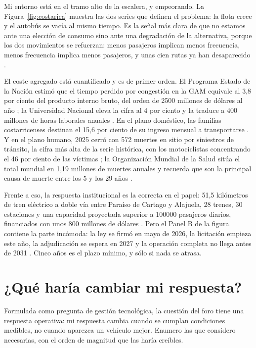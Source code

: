 \documentclass[11pt,letterpaper]{article}
\begin{document}
Mi entorno está en el tramo alto de la escalera, y empeorando. La
Figura~\ref{fig:costarica} muestra las dos series que definen el problema:
la flota crece y el autobús se vacía al mismo tiempo. Es la señal más clara de
que no estamos ante una elección de consumo sino ante una degradación de la
alternativa, porque los dos movimientos se refuerzan: menos pasajeros implican
menos frecuencia, menos frecuencia implica menos pasajeros, y unas cien rutas
ya han desaparecido \parencite{una2026}.

El coste agregado está cuantificado y es de primer orden. El Programa Estado de
la Nación estimó que el tiempo perdido por congestión en la GAM equivale al 3,8
por ciento del producto interno bruto, del orden de \num{2500} millones de
dólares al año \parencite{semanario2018,allen2026}; la Universidad Nacional
eleva la cifra al 4 por ciento y la traduce a 400 millones de horas laborales
anuales \parencite{una2026}. En el plano doméstico, las familias
costarricenses destinan el 15,6 por ciento de su ingreso mensual a
transportarse \parencite{allen2024}. Y en el plano humano, 2025 cerró con 572
muertes en sitio por siniestros de tránsito, la cifra más alta de la serie
histórica, con los motociclistas concentrando el 46 por ciento de las víctimas
\parencite{observador2026}; la Organización Mundial de la Salud sitúa el total
mundial en 1,19 millones de muertes anuales y recuerda que son la principal
causa de muerte entre los 5 y los 29 años \parencite{who2023}.

Frente a eso, la respuesta institucional es la correcta en el papel: 51,5
kilómetros de tren eléctrico a doble vía entre Paraíso de Cartago y Alajuela,
28 trenes, 30 estaciones y una capacidad proyectada superior a \num{100000}
pasajeros diarios, financiados con unos 800 millones de dólares
\parencite{semanario2025}. Pero el Panel B de la figura contiene la parte
incómoda: la ley se firmó en mayo de 2026, la licitación empieza este año, la
adjudicación se espera en 2027 y la operación completa no llega antes de 2031
\parencite{teletica2026}. Cinco años es el plazo mínimo, y sólo si nada se
atrasa.

\section{¿Qué haría cambiar mi respuesta?}

Formulada como pregunta de gestión tecnológica, la cuestión del foro tiene una
respuesta operativa: mi respuesta cambia cuando se cumplan condiciones
medibles, no cuando aparezca un vehículo mejor. Enumero las que considero
necesarias, con el orden de magnitud que las haría creíbles.
\end{document}
